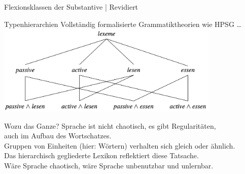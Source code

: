 \begin{frame}
  {Flexionsklassen der Substantive | Revidiert}
  \onslide<+->
  \onslide<+->
  \centering
\end{frame}

\begin{frame}
  {Typenhierarchien}
  \onslide<+->
  \onslide<+->
  Vollständig formalisierte Grammatiktheorien wie HPSG \citep{Mueller2013a} \ldots\\
  \Zeile
  \onslide<+->
  \centering 
  \includegraphics[width=0.8\textwidth]{graphics/typ_auto}\\
\end{frame}

\begin{frame}
  {Wozu das Ganze?}
  \onslide<+->
  \onslide<+->
  Sprache ist nicht chaotisch, es gibt \alert{Regularitäten}, \\
  auch im \alert{Aufbau des Wortschatzes}.\\
  \Zeile
  \onslide<+->
  \alert{Gruppen von Einheiten} (hier: Wörtern) verhalten sich gleich oder ähnlich.\\
  \Zeile
  \onslide<+->
  Das \alert{hierarchisch gegliederte Lexikon} reflektiert diese Tatsache.\\
  \Zeile
  \onslide<+->
  Wäre Sprache chaotisch, wäre Sprache unbenutzbar und unlernbar.
\end{frame}

